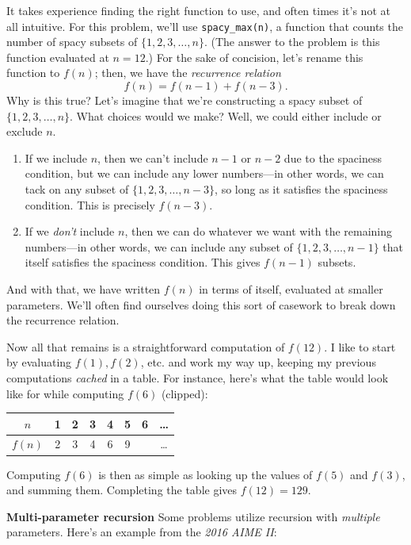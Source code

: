 \documentclass{article}
\begin{document}
It takes experience finding the right function to use, and often times it's not at all intuitive. For this problem, we'll use \texttt{spacy\_max(n)}, a function that counts the number of spacy subsets of $\{1, 2, 3, \dots, n\}$. (The answer to the problem is this function evaluated at $n=12$.) For the sake of concision, let's rename this function to $f(n)$; then, we have the \textit{recurrence relation}
$$f(n) = f(n - 1) + f(n - 3).$$Why is this true? Let's imagine that we're constructing a spacy subset of $\{1, 2, 3, \dots, n\}$. What choices would we make? Well, we could either include or exclude $n$.
\begin{enumerate}
\item If we include $n$, then we can't include $n - 1$ or $n - 2$ due to the spaciness condition, but we can include any lower numbers—in other words, we can tack on any subset of $\{1, 2, 3, \dots, n - 3\}$, so long as it satisfies the spaciness condition. This is precisely $f(n - 3)$.
\item If we \textit{don't} include $n$, then we can do whatever we want with the remaining numbers—in other words, we can include any subset of $\{1, 2, 3, \dots, n - 1\}$ that itself satisfies the spaciness condition. This gives $f(n - 1)$ subsets.
\end{enumerate}
And with that, we have written $f(n)$ in terms of itself, evaluated at smaller parameters. We'll often find ourselves doing this sort of casework to break down the recurrence relation.

Now all that remains is a straightforward computation of $f(12)$. I like to start by evaluating $f(1), f(2)$, etc. and work my way up, keeping my previous computations \textit{cached} in a table. For instance, here's what the table would look like for while computing $f(6)$ (clipped):
\begin{table}[h!]
    \centering
    \begin{tabular}{c|c|c|c|c|c|c|c}
         $n$ & 1 & 2 & 3 & 4 & 5 & 6 & \dots \\\hline
         $f(n)$ & 2 & 3 & 4 & 6 & 9 & & \dots
    \end{tabular}
\end{table}
Computing $f(6)$ is then as simple as looking up the values of $f(5)$ and $f(3)$, and summing them. Completing the table gives $f(12) = 129$.

\textbf{Multi-parameter recursion}
Some problems utilize recursion with \textit{multiple} parameters. Here's an example from the \textit{2016 AIME II}:
\end{document}
